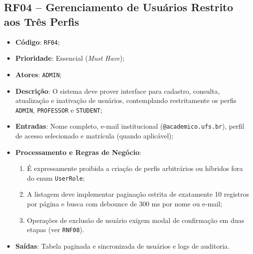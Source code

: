 \subsection{RF04 -- Gerenciamento de Usuários Restrito aos Três Perfis}
\begin{itemize}
    \item \textbf{Código}: \texttt{RF04};
    \item \textbf{Prioridade}: Essencial (\textit{Must Have});
    \item \textbf{Atores}: \texttt{ADMIN};
    \item \textbf{Descrição}: O sistema deve prover interface para cadastro, consulta, atualização e inativação de usuários, contemplando restritamente os perfis \texttt{ADMIN}, \texttt{PROFESSOR} e \texttt{STUDENT};
    \item \textbf{Entradas}: Nome completo, e-mail institucional (\texttt{@academico.ufs.br}), perfil de acesso selecionado e matrícula (quando aplicável);
    \item \textbf{Processamento e Regras de Negócio}:
    \begin{enumerate}
        \item É expressamente proibida a criação de perfis arbitrários ou híbridos fora do enum \texttt{UserRole};
        \item A listagem deve implementar paginação estrita de exatamente 10 registros por página e busca com debounce de 300 ms por nome ou e-mail;
        \item Operações de exclusão de usuário exigem modal de confirmação em duas etapas (ver \texttt{RNF08}).
    \end{enumerate}
    \item \textbf{Saídas}: Tabela paginada e sincronizada de usuários e logs de auditoria.
\end{itemize}

